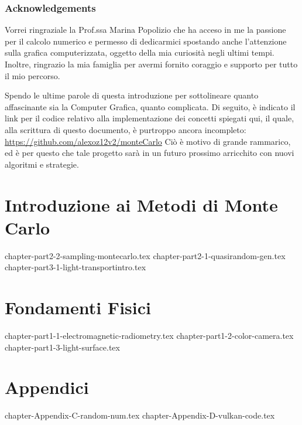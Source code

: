 \documentclass[10pt, openany]{book}
\theoremstyle{theoremdd}
\begin{document}
	\section*{Acknowledgements}
	Vorrei ringraziale la Prof.ssa Marina Popolizio che ha acceso in me la passione per il calcolo numerico e permesso di dedicarmici spostando anche 
	l'attenzione sulla grafica computerizzata, oggetto della mia curiosit\`a negli ultimi tempi. Inoltre, ringrazio la mia famiglia per avermi fornito
	coraggio e supporto per tutto il mio percorso.\par
	Spendo le ultime parole di questa introduzione per sottolineare quanto affascinante sia la Computer Grafica, quanto complicata. Di seguito, \`e 
	indicato il link per il codice relativo alla implementazione dei concetti spiegati qui, il quale, alla scrittura di questo documento, \`e 
	purtroppo ancora incompleto: \href{https://github.com/alexoz12v2/monteCarlo}{https://github.com/alexoz12v2/monteCarlo}
	Ci\`o \`e motivo di grande rammarico, ed \`e per questo che tale progetto sar\`a in un futuro prossimo arricchito con nuovi algoritmi e strategie.

	\tableofcontents

	\mainmatter
	\part{Introduzione ai Metodi di Monte Carlo}
	{chapter-part2-2-sampling-montecarlo.tex}
	{chapter-part2-1-quasirandom-gen.tex}
	{chapter-part3-1-light-transportintro.tex}

	\part{Fondamenti Fisici}
	{chapter-part1-1-electromagnetic-radiometry.tex}
	{chapter-part1-2-color-camera.tex}
	{chapter-part1-3-light-surface.tex}

	\part{Appendici}
	\appendix
	{chapter-Appendix-C-random-num.tex}
	{chapter-Appendix-D-vulkan-code.tex}

	\backmatter
	\printbibliography

	\printglossaries
\end{document}
